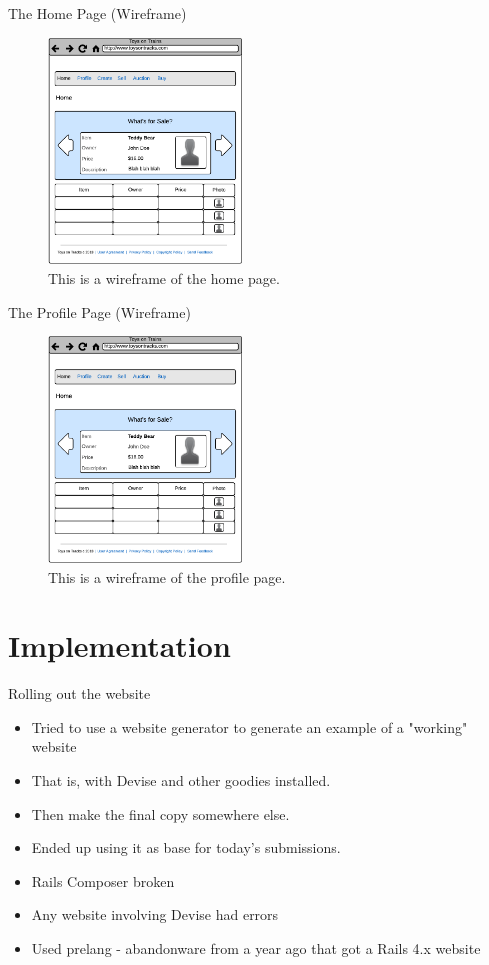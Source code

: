 \documentclass[10pt]{beamer}
\begin{document}
\begin{frame}{The Home Page (Wireframe)}
\begin{figure} [!h]
    \centering
    \includegraphics[height=6cm]{../img/home.png}

\caption{This is a wireframe of the home page.}

\end{figure}
\end{frame}

\begin{frame}{The Profile Page (Wireframe)}
\begin{figure} [!h]
    \centering
    \includegraphics[height=6cm]{../img/home.png}

\caption{This is a wireframe of the profile page.}

\end{figure}
\end{frame}

\section{Implementation}

\begin{frame}{Rolling out the website}
\begin{itemize}
\item Tried to use a website generator to generate an example of a "working" website
\item That is, with Devise and other goodies installed.
\item Then make the final copy somewhere else.
\item Ended up using it as base for today's submissions.
\item Rails Composer broken
\item Any website involving Devise had errors 
\item Used prelang - abandonware from a year ago that got a Rails 4.x website
\end{itemize} 
\end{frame}
\end{document}
